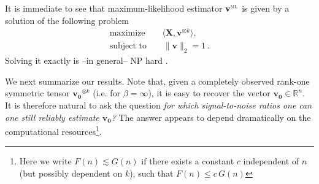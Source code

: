 \documentclass[11pt]{article}
\theoremstyle{definition}
\def\sML{\mbox{\tiny\sc ML}}
\def\<{\langle}
\def\>{\rangle}
\def\reals{\mathbb{R}}
\def\bv{\mathbf{v}}
\def\bvz{\mathbf{v_0}}
\def\bX{\mathbf{X}}
\def\ok{{^{\otimes k}}}
\begin{document}
It is immediate to see that  maximum-likelihood estimator  $\bv^{\sML}$ is given by a
solution of the following problem 
%
\begin{align}\tag*{Tensor PCA}
%
\text{maximize} & \;\;\;\, \<\bX,\bv\ok\>  ,\label{eq:TPCA}\\
\text{subject to} & \;\;\;\; \|\bv\|_2= 1\,  .\nonumber
%
\end{align}
%
Solving it exactly is --in general-- NP hard \cite{hillar2013most}.


We next summarize our results. 
Note that, given a completely observed rank-one symmetric tensor
$\bvz\ok$ (i.e. for $\beta=\infty$), 
it is easy to recover the vector $\bvz\in\reals^n$.  It is therefore
natural to ask the question
\emph{for which  signal-to-noise ratios one can one still reliably
  estimate $\bvz$?} 
The answer appears to depend dramatically on the computational
resources\footnote{Here we write $F(n)\lesssim G(n)$ if there
  exists a constant $c$ independent of $n$ (but possibly dependent on
  $k$), such that $F(n)\le c\, G(n)$}.
%
\end{document}
